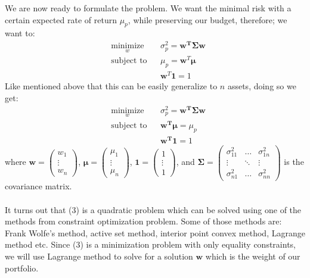 \documentclass[12pt,titlepage,a4paper]{article}
\begin{document}
			We are now ready to formulate the problem. We want the minimal risk with a certain expected rate of return $\mu_p$, while preserving our budget, therefore; we want to: 
			\begin{equation}
				\begin{aligned}
					& \underset{w}{\text{minimize}}
					& &\sigma_p^2 = \mathbf{w^T\Sigma w}\\
					& \text{subject to}
					& & \mu_p = \mathbf{w}^T\pmb{\mu} \\
					&&& \mathbf{w}^T\mathbf{1}=1
				\end{aligned}
			\end{equation}
			Like mentioned above that this can be easily generalize to $n$ assets, doing so we get: 
			\begin{equation}
				\begin{aligned}
					& \underset{w}{\text{minimize}}
					& &\sigma_p^2 = \mathbf{w^T\Sigma w}\\
					& \text{subject to}
					& & \mathbf{w^T}\pmb{\mu} = \mu_p \\
					&&& \mathbf{w^T1}=1
				\end{aligned}
			\end{equation}
			where $\mathbf{w} = \begin{pmatrix} w_1 \\ \vdots \\ w_n \end{pmatrix}$, $\pmb{\mu} = \begin{pmatrix} \mu_1 \\ \vdots \\ \mu_n \end{pmatrix}$, $\mathbf{1} = \begin{pmatrix}1 \\ \vdots \\ 1 \end{pmatrix}$, and $\mathbf{\Sigma} = \begin{pmatrix}\sigma_{11}^2 & \dots & \sigma_{1n}^2 \\ \vdots & \ddots & \vdots\\  \sigma_{n1}^2 & \dots & \sigma_{nn}^2 \end{pmatrix}$ is the covariance matrix.\\ \\ 
			It turns out that (3) is a quadratic problem which can be solved using one of the methods from constraint optimization problem. Some of those methods are: Frank Wolfe's method, active set method, interior point convex method, Lagrange method etc. Since (3) is a minimization problem with only equality constraints, we will use Lagrange method to solve for a solution $\mathbf{w}$ which is the weight of our portfolio. 
\end{document}
